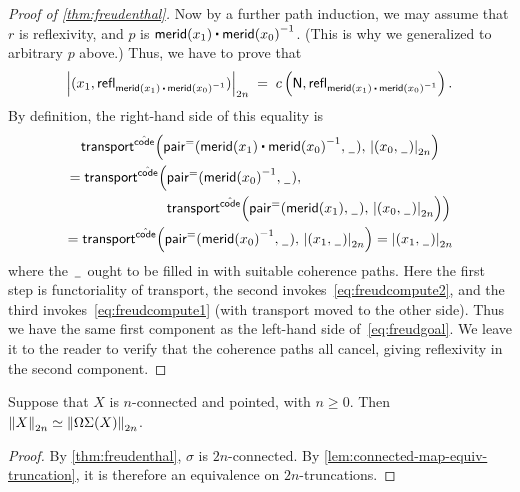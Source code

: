 \begin{proof}[Proof of \autoref{thm:freudenthal}]
  Now by a further path induction, we may assume that $r$ is reflexivity, and $p$ is $\merid(x_1) \ct \opp{\merid(x_0)}$.
  (This is why we generalized to arbitrary $p$ above.)
  Thus, we have to prove that
  \begin{equation}
    \tproj{2n}{(x_1, \refl{\merid(x_1) \ct \opp{\merid(x_0)}})}
    \;=\;
    c\left(\north,\refl{\merid(x_1) \ct \opp{\merid(x_0)}}\right).\label{eq:freudgoal}
  \end{equation}
  By definition, the right-hand side of this equality is
  \begin{multline*}
    \Transfib{\hat{\code}}{\pairpath(\merid(x_1) \ct \opp{\merid(x_0)}, \nameless)}{\tproj{2n}{(x_0,\nameless)}} \\
    = \transfibf{\hat{\code}}
    \begin{aligned}[t]
      \Big(
      &{\pairpath(\opp{\merid(x_0)}, \nameless)},\\
      &{\Transfib{\hat{\code}}{\pairpath(\merid(x_1), \nameless)}{\tproj{2n}{(x_0,\nameless)}}}
      \Big)
    \end{aligned}
    \\
    = \Transfib{\hat{\code}}{\pairpath(\opp{\merid(x_0)}, \nameless)}{\tproj{2n}{(x_1,\nameless)}}
    = \tproj{2n}{(x_1,\nameless)}
  \end{multline*}
  where the $\nameless$ ought to be filled in with suitable coherence paths.
  Here the first step is functoriality of transport, the second invokes~\eqref{eq:freudcompute2}, and the third invokes~\eqref{eq:freudcompute1} (with transport moved to the other side).
  Thus we have the same first component as the left-hand side of~\eqref{eq:freudgoal}.
  We leave it to the reader to verify that the coherence paths all cancel, giving reflexivity in the second component.
\end{proof}


\begin{cor} \label{cor:freudenthal-equiv}
Suppose that $X$ is $n$-connected and pointed, with $n\geq 0$.
Then $\eqv{\trunc{2n}{X}}{\trunc{2n}{\Omega\susp(X)}}$.
\end{cor}
\begin{proof}
By \cref{thm:freudenthal}, $\sigma$ is $2n$-connected.  By
\cref{lem:connected-map-equiv-truncation}, it is therefore an
equivalence on $2n$-truncations.  
\end{proof}

%

